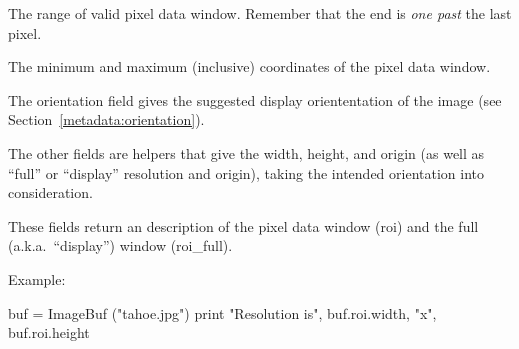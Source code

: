 The range of valid pixel data window. Remember that the {\cf end} is 
\emph{one past} the last pixel.
\apiend

The minimum and maximum (inclusive) coordinates of the pixel data window.
\apiend

The {\cf orientation} field gives the suggested display oriententation of
the image (see Section~\ref{metadata:orientation}).

The other fields are helpers that give the width, height, and origin
(as well as ``full'' or ``display'' resolution and origin), taking the
intended orientation into consideration.
\apiend

These fields return an \ROI description of the pixel data window
({\cf roi}) and the full (a.k.a.\ ``display'') window ({\cf roi_full}).

\noindent Example:
\begin{code}
    buf = ImageBuf ("tahoe.jpg")
    print "Resolution is", buf.roi.width, "x", buf.roi.height
\end{code}
\apiend

